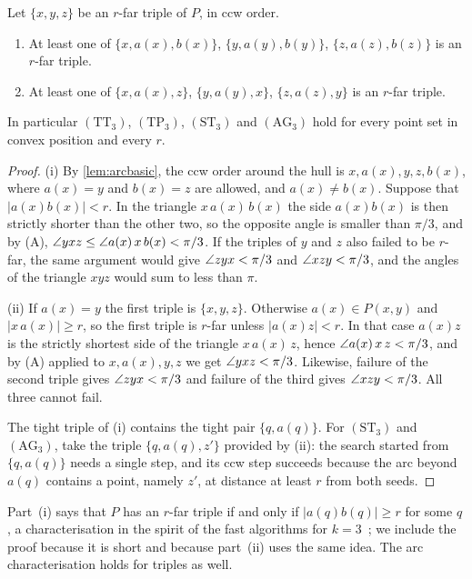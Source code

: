 \begin{theorem}\label{thm:k3}
Let $\{x,y,z\}$ be an $r$-far triple of $P$, in ccw order.
\begin{enumerate}[label=(\roman*),itemsep=1pt,topsep=2pt]
\item At least one of $\{x,a(x),b(x)\}$, $\{y,a(y),b(y)\}$,
$\{z,a(z),b(z)\}$ is an $r$-far triple.
\item At least one of $\{x,a(x),z\}$, $\{y,a(y),x\}$, $\{z,a(z),y\}$ is an
$r$-far triple.
\end{enumerate}
In particular $(\mathrm{TT}_3)$, $(\mathrm{TP}_3)$, $(\mathrm{ST}_3)$ and
$(\mathrm{AG}_3)$ hold for every point set in convex position and every $r$.
\end{theorem}
\begin{proof}
(i) By \cref{lem:arcbasic}, the ccw order around the hull is
$x,a(x),y,z,b(x)$, where $a(x)=y$ and $b(x)=z$ are allowed, and
$a(x)\ne b(x)$. Suppose that $|a(x)b(x)|<r$. In the triangle $x\,a(x)\,b(x)$
the side $a(x)b(x)$ is then strictly shorter than the other two, so the
opposite angle is smaller than $\pi/3$, and by (A),
$\angle yxz\le\angle a(x)\,x\,b(x)<\pi/3$. If the triples of $y$ and $z$ also
failed to be $r$-far, the same argument would give $\angle zyx<\pi/3$ and
$\angle xzy<\pi/3$, and the angles of the triangle $xyz$ would sum to less than
$\pi$.

(ii) If $a(x)=y$ the first triple is $\{x,y,z\}$. Otherwise $a(x)\in P(x,y)$
and $|x\,a(x)|\ge r$, so the first triple is $r$-far unless $|a(x)z|<r$. In
that case $a(x)z$ is the strictly shortest side of the triangle $x\,a(x)\,z$,
hence $\angle a(x)\,x\,z<\pi/3$, and by (A) applied to $x,a(x),y,z$ we get
$\angle yxz<\pi/3$. Likewise, failure of the second triple gives
$\angle zyx<\pi/3$ and failure of the third gives $\angle xzy<\pi/3$. All three
cannot fail.

The tight triple of (i) contains the tight pair $\{q,a(q)\}$. For
$(\mathrm{ST}_3)$ and $(\mathrm{AG}_3)$, take the triple $\{q,a(q),z'\}$
provided by (ii): the search started from $\{q,a(q)\}$ needs a single step,
and its ccw step succeeds because the arc beyond $a(q)$ contains a point,
namely $z'$, at distance at least $r$ from both seeds.
\end{proof}

Part~(i) says that $P$ has an $r$-far triple if and only if
$|a(q)b(q)|\ge r$ for some $q$, a characterisation in the spirit of the
fast algorithms for $k=3$~\citep{kobayashi,tw25}; we include the proof
because it is short and because part~(ii) uses the same idea. The arc
characterisation holds for triples as well.

